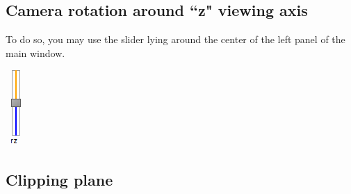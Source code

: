 \subsection{Camera rotation around ``z" viewing axis}

\begin{minipage}{0.7\textwidth}
To do so, you may use the slider lying around the center of the left panel of the main window.
\end{minipage}    
\begin{minipage}{0.25\textwidth}\centering
  \includegraphics[scale=0.7]{images/06/camera/rz_cam.png}
 \end{minipage}    



\subsection{Clipping plane}

